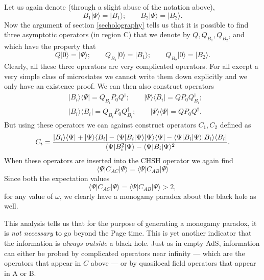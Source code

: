 \documentclass[12pt]{article}
\newcommand{\be}{\begin{equation}}
\newcommand{\ee}{\end{equation}}
\def\projvac{{\cal P}_{\Omega}}
\def\projvac{P_0}
\begin{document}
Let us again denote (through a slight abuse of the notation above),
\be
B_1 | \Psi \rangle = |B_1 \rangle; \qquad B_2 |\Psi \rangle = |B_2 \rangle.
\ee
Now the argument of section \ref{secholography} tells us that it is possible to find three asymptotic operators (in region C) that we denote by $Q, Q_{B_1}, Q_{B_2}$, and which have the property that
\be
Q | 0 \rangle = |\Psi \rangle; \qquad Q_{B_1} | 0 \rangle = |B_1 \rangle ; \qquad Q_{B_2} | 0 \rangle = |B_2 \rangle.
\ee
Clearly, all these three operators are very complicated operators. For all except a very simple class of microstates we cannot write them down explicitly and we only have an existence proof.  We can then also construct
operators
\be
\begin{split}
&|B_i \rangle \langle \Psi| = Q_{B_i} \projvac Q^{\dagger}; \qquad |\Psi \rangle \langle B_i| = Q \projvac Q_{B_i}^{\dagger}; \\
&|B_i \rangle \langle B_i | = Q_{B_i} \projvac Q_{B_i}^{\dagger}; \qquad |\Psi \rangle \langle \Psi| = Q \projvac Q^{\dagger}.
\end{split}
\ee
But using these operators we can against construct operators $C_1, C_2$ defined as
\be
C_i =  { |B_i \rangle \langle \Psi | + |\Psi \rangle \langle B_i |  - \langle \Psi | B_i | \Psi \rangle |\Psi \rangle \langle \Psi |  - \langle \Psi | B_i | \Psi \rangle |B_i \rangle \langle B_i|  \over  \langle \Psi | B_i^2 | \Psi \rangle - \langle \Psi | B_i| \Psi \rangle^2 }.
\ee
When these operators are inserted into the CHSH operator we again find
\be
\langle \Psi | C_{AC} |\Psi \rangle =  \langle \Psi | C_{AB} |\Psi \rangle
\ee
Since both the expectation values
\be
\langle \Psi | C_{AC} |\Psi \rangle = \langle \Psi | C_{AB} |\Psi \rangle > 2,
\ee
for any value of $\omega$, we clearly have a monogamy paradox about the black hole as well.



This analysis tells us that for the purpose of generating a monogamy paradox,  it is {\em not necessary} to go beyond the Page time. This is yet another indicator that the information is {\em always outside} a black hole. Just as in empty AdS, information can either be probed by complicated operators near infinity --- which are the operators that appear in $C$ above --- or by quasilocal field operators that appear in A or B. 
\end{document}
